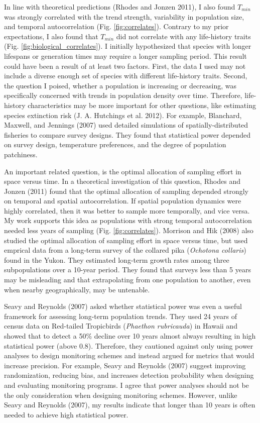 \documentclass[12pt,]{article}
\begin{document}
\begin{spacing}{2}
In line with theoretical predictions (Rhodes and Jonzen 2011), I also
found \(T_{min}\) was strongly correlated with the trend strength,
variability in population size, and temporal autocorrelation (Fig.
\ref{fig:correlates}). Contrary to my prior expectations, I also found
that \(T_{min}\) did not correlate with any life-history traits (Fig.
\ref{fig:biological_correlates}). I initially hypothesized that species
with longer lifespans or generation times may require a longer sampling
period. This result could have been a result of at least two factors.
First, the data I used may not include a diverse enough set of species
with different life-history traits. Second, the question I poised,
whether a population is increasing or decreasing, was specifically
concerned with trends in population density over time. Therefore,
life-history characteristics may be more important for other questions,
like estimating species extinction risk (J. A. Hutchings et al. 2012).
For example, Blanchard, Maxwell, and Jennings (2007) used detailed
simulations of spatially-distributed fisheries to compare survey
designs. They found that statistical power depended on survey design,
temperature preferences, and the degree of population patchiness.

An important related question, is the optimal allocation of sampling
effort in space versus time. In a theoretical investigation of this
question, Rhodes and Jonzen (2011) found that the optimal allocation of
sampling depended strongly on temporal and spatial autocorrelation. If
spatial population dynamics were highly correlated, then it was better
to sample more temporally, and vice versa. My work supports this idea as
populations with strong temporal autocorrelation needed less years of
sampling (Fig. \ref{fig:correlates}). Morrison and Hik (2008) also
studied the optimal allocation of sampling effort in space versus time,
but used emprical data from a long-term survey of the collared pika
(\emph{Ochotona collaris}) found in the Yukon. They estimated long-term
growth rates among three subpopulations over a 10-year period. They
found that surveys less than 5 years may be misleading and that
extrapolating from one population to another, even when nearby
geographically, may be untenable.

Seavy and Reynolds (2007) asked whether statistical power was even a
useful framework for assessing long-term population trends. They used 24
years of census data on Red-tailed Tropicbirds
(\emph{Phaethon rubricauda}) in Hawaii and showed that to detect a 50\%
decline over 10 years almost always resulting in high statistical power
(above 0.8). Therefore, they cautioned against only using power analyses
to design monitoring schemes and instead argued for metrics that would
increase precision. For example, Seavy and Reynolds (2007) suggest
improving randomization, reducing bias, and increases detection
probability when designing and evaluating monitoring programs. I agree
that power analyses should not be the only consideration when designing
monitoring schemes. However, unlike Seavy and Reynolds (2007), my
results indicate that longer than 10 years is often needed to achieve
high statistical power.


\end{spacing}
\end{document}
